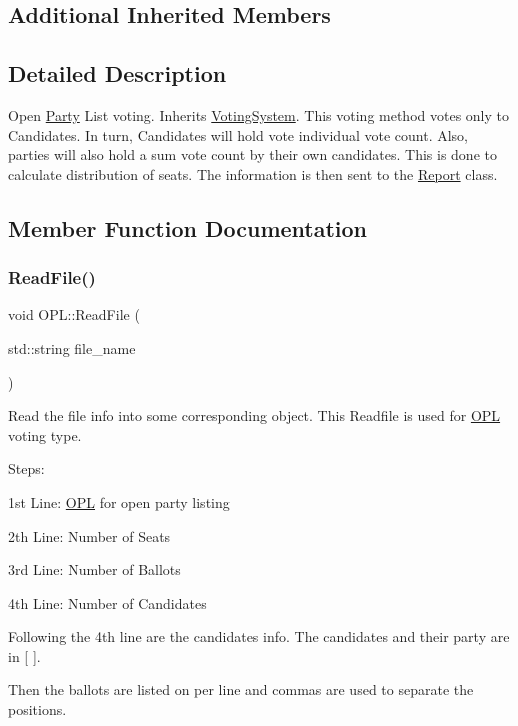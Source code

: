 \subsection*{Additional Inherited Members}


\subsection{Detailed Description}
Open \hyperlink{classParty}{Party} List voting. Inherits \hyperlink{classVotingSystem}{Voting\+System}. This voting method votes only to Candidates. In turn, Candidates will hold vote individual vote count. Also, parties will also hold a sum vote count by their own candidates. This is done to calculate distribution of seats. The information is then sent to the \hyperlink{classReport}{Report} class. 

\subsection{Member Function Documentation}
\mbox{\label{classOPL_af13e5b6927d0bd0b979727ba30482cff}} 
\subsubsection{\texorpdfstring{Read\+File()}{ReadFile()}}
{\footnotesize\ttfamily void O\+P\+L\+::\+Read\+File (\begin{DoxyParamCaption}\item[{std\+::string}]{file\+\_\+name }\end{DoxyParamCaption})\hspace{0.3cm}{\ttfamily [override]}}



Read the file info into some corresponding object. This Readfile is used for \hyperlink{classOPL}{O\+PL} voting type. 

Steps\+:
\begin{DoxyItemize}
\item 1st Line\+: \hyperlink{classOPL}{O\+PL} for open party listing
\item 2th Line\+: Number of Seats
\item 3rd Line\+: Number of Ballots
\item 4th Line\+: Number of Candidates
\item Following the 4th line are the candidates info. The candidates and their party are in \mbox{[} \mbox{]}.
\item Then the ballots are listed on per line and commas are used to separate the positions.
\end{DoxyItemize}

